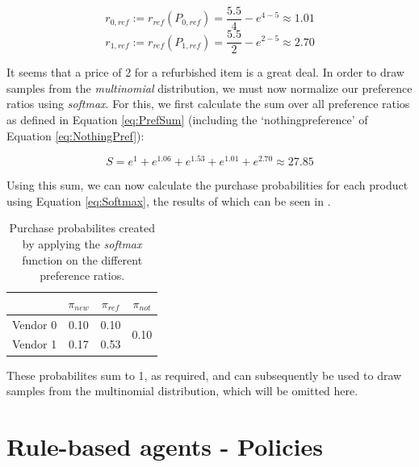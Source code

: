\begin{equation}
	r_{0,ref} := r_{ref}(P_{0,ref}) = \frac{5.5}{4} - e^{4 - 5} \approx 1.01
\end{equation}
\begin{equation}
	r_{1,ref} := r_{ref}(P_{1,ref}) = \frac{5.5}{2} - e^{2 - 5} \approx 2.70
\end{equation}

It seems that a price of 2 for a refurbished item is a great deal. In order to draw samples from the \emph{multinomial} distribution, we must now normalize our preference ratios using \emph{softmax}. For this, we first calculate the sum over all preference ratios as defined in Equation \eqref{eq:PrefSum} (including the `nothingpreference' of Equation \eqref{eq:NothingPref}):

\begin{equation}
	S = e^{1} + e^{1.06} + e^{1.53} + e^{1.01} + e^{2.70} \approx 27.85
\end{equation}

Using this sum, we can now calculate the purchase probabilities for each product using Equation \eqref{eq:Softmax}, the results of which can be seen in .

\begin{table}[!htb]
	\begin{tabular}{|r|c|c|c|}
		\hline
		         & \(\pi_{new}\) & \(\pi_{ref}\) & \(\pi_{not}\)         \\\hline
		Vendor 0 & 0.10          & 0.10          & \multirow{2}{*}{0.10} \\\cline{1-3}
		Vendor 1 & 0.17          & 0.53          &                       \\\hline
	\end{tabular}\medskip
	\caption{Purchase probabilites created by applying the \emph{softmax} function on the different preference ratios.}\label{tab:CustomerExampleSoftmax}
\end{table}

\noindent These probabilites sum to 1, as required, and can subsequently be used to draw samples from the multinomial distribution, which will be omitted here.

\newpage
\section{Rule-based agents - Policies}\label{sec:AppendixPolicies}

